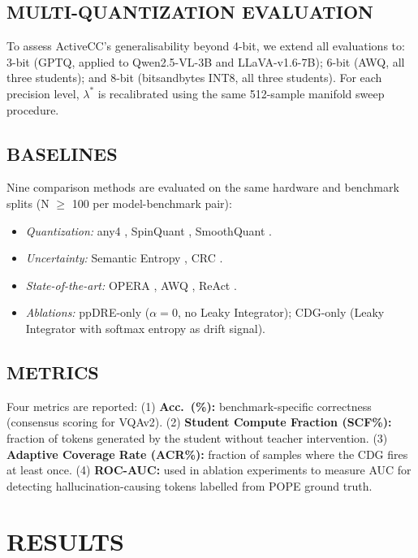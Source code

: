 \documentclass{ieeetmlcn}
\begin{document}
\subsection{MULTI-QUANTIZATION EVALUATION}
To assess ActiveCC's generalisability beyond 4-bit, we extend all
evaluations to: 3-bit (GPTQ, applied to Qwen2.5-VL-3B and
LLaVA-v1.6-7B); 6-bit (AWQ, all three students); and 8-bit
(bitsandbytes INT8, all three students). For each precision level,
$\lambda^*$ is recalibrated using the same 512-sample manifold sweep
procedure.

\subsection{BASELINES}
Nine comparison methods are evaluated on the same hardware and benchmark
splits (N $\geq$ 100 per model-benchmark pair):
\begin{itemize}
  \item \emph{Quantization:} any4 \cite{elhoushi2025any}, SpinQuant
        \cite{liu2025spinquant}, SmoothQuant \cite{xiao2023smoothquant}.
  \item \emph{Uncertainty:} Semantic Entropy \cite{kuhn2023semantic},
        CRC \cite{angelopoulos2024conformal}.
  \item \emph{State-of-the-art:} OPERA \cite{huang2023opera}, AWQ
        \cite{lin2024awq}, ReAct \cite{yao2022react}.
  \item \emph{Ablations:} ppDRE-only ($\alpha=0$, no Leaky Integrator);
        CDG-only (Leaky Integrator with softmax entropy as drift signal).
\end{itemize}

\subsection{METRICS}
Four metrics are reported: (1) \textbf{Acc.\ (\%):} benchmark-specific correctness (consensus scoring for VQAv2). (2) \textbf{Student Compute Fraction (SCF\%):} fraction of tokens generated by the student without teacher intervention. (3) \textbf{Adaptive Coverage Rate (ACR\%):} fraction of samples where the CDG fires at least once. (4) \textbf{ROC-AUC:} used in ablation experiments to measure AUC for detecting hallucination-causing tokens labelled from POPE ground truth.

\section{RESULTS}
\label{sec:results}
\end{document}
